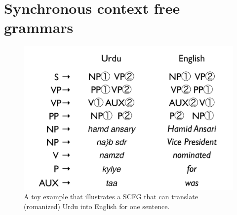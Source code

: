 
\chapter{Synchronous context free grammars} \label{sec:scfg}



\begin{figure}
\begin{center}
\includegraphics[width=.6\linewidth]{SCFGs/example-scfg}
\end{center}
\caption{A toy example that illustrates a SCFG that can translate (romanized) Urdu into English for one sentence.    }\label{toy-scfg} 
\end{figure}


